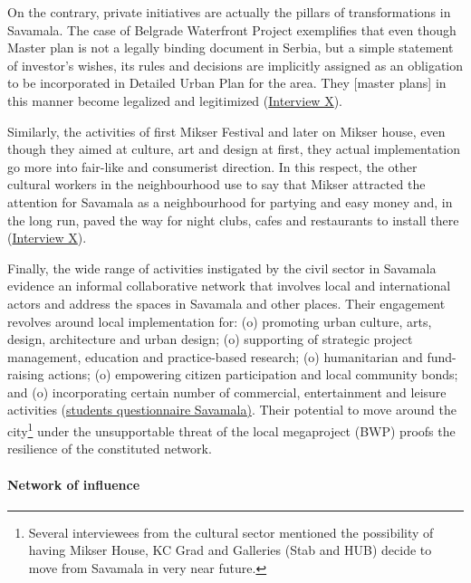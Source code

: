 \documentclass[11pt]{report}
\begin{document}
On the contrary, private initiatives are actually the pillars of transformations in Savamala. The case of Belgrade Waterfront Project exemplifies that even though Master plan is not a legally binding document in Serbia, but a simple statement of investor's wishes, its rules and decisions are implicitly assigned as an obligation to be incorporated in Detailed Urban Plan for the area.
They [master plans] in this manner become legalized and legitimized (\href{InterviewX}{Interview X}).

Similarly, the activities of first Mikser Festival and later on Mikser house, even though they aimed at culture, art and design at first, they actual implementation go more into fair-like and consumerist direction.
In this respect, the other cultural workers in the neighbourhood use to say that Mikser attracted the attention for Savamala as a neighbourhood for partying and easy money and, in the long run, paved the way for night clubs, cafes and restaurants to install there
(\href{InterviewX}{Interview X}).

Finally, the wide range of activities instigated by the civil sector in Savamala evidence an informal collaborative network that involves local and international actors and address the spaces in Savamala and other places.
Their engagement revolves around local implementation for:
(o) promoting urban culture, arts, design, architecture and urban design;
(o) supporting of strategic project management, education and practice-based research;
(o) humanitarian and fund-raising actions;
(o) empowering citizen participation and local community bonds;
and
(o) incorporating certain number of commercial, entertainment and leisure activities
(\href{ref}{students questionnaire Savamala)}.
Their potential to move around the city\footnote{Several interviewees from the cultural sector mentioned the possibility of having Mikser House, KC Grad and Galleries (Stab and HUB) decide to move from Savamala in very near future.}
under the unsupportable threat of the local megaproject (BWP) proofs the resilience of the constituted network.  

\paragraph{Network of influence}
\end{document}
